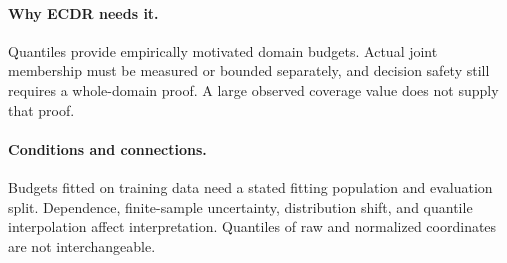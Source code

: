 \paragraph{Why ECDR needs it.}
Quantiles provide empirically motivated domain budgets. Actual joint
membership must be measured or bounded separately, and decision safety
still requires a whole-domain proof. A large observed coverage value
does not supply that proof.
\paragraph{Conditions and connections.}
Budgets fitted on training data need a stated fitting population and
evaluation split. Dependence, finite-sample uncertainty, distribution
shift, and quantile interpolation affect interpretation. Quantiles of
raw and normalized coordinates are not interchangeable.



